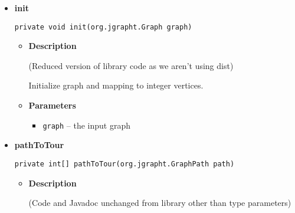 \documentclass[11pt,a4paper]{report}
\begin{document}
{{{{{{{{{{{{\begin{itemize}
{\begin{itemize}
{Try to improve a tour by running the 2-opt heuristic using the FlightPlanner to measure the length of tours.
}
\item{
{\bf  Parameters}
  \begin{itemize}
   \item{
\texttt{graphPath} -- a tour}
  \end{itemize}
}%
\item{{\bf  Returns} -- 
a possibly improved tour 
}%
\end{itemize}
}%
\item{ 
\hypertarget{uk.ac.ed.inf.aqmaps.flightplanning.EnhancedTwoOptTSP.init(org.jgrapht.Graph)}{{\bf  init}\\}
\begin{lstlisting}[frame=none]
private void init(org.jgrapht.Graph graph)\end{lstlisting} %
\begin{itemize}
\item{
{\bf  Description}

(Reduced version of library code as we aren't using dist\lbrack \rbrack \lbrack \rbrack )

Initialize graph and mapping to integer vertices.
}
\item{
{\bf  Parameters}
  \begin{itemize}
   \item{
\texttt{graph} -- the input graph}
  \end{itemize}
}%
\end{itemize}
}%
\item{ 
\hypertarget{uk.ac.ed.inf.aqmaps.flightplanning.EnhancedTwoOptTSP.pathToTour(org.jgrapht.GraphPath)}{{\bf  pathToTour}\\}
\begin{lstlisting}[frame=none]
private int[] pathToTour(org.jgrapht.GraphPath path)\end{lstlisting} %
\begin{itemize}
\item{
{\bf  Description}

(Code and Javadoc unchanged from library other than type parameters)

}
\end{itemize}}
\end{itemize}}}}}}}}}}}}}
\end{document}
